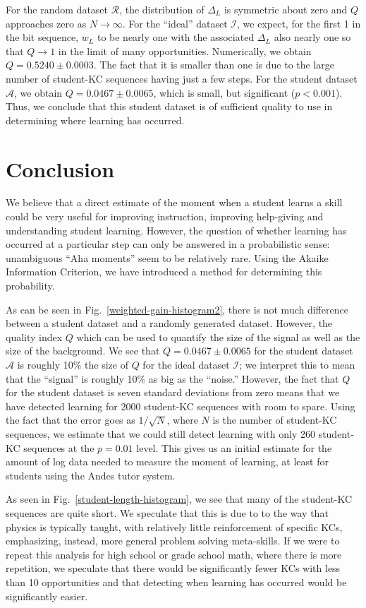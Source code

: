 \documentclass{acmlarge-edm}
\begin{document}
For the random dataset $\mathcal{R}$, the distribution of $\Delta_L$
is symmetric about zero and $Q$ approaches zero as $N \to \infty$.
For the ``ideal'' dataset $\mathcal{I}$, we expect, for the first 1 in
the bit sequence, $w_L$ to be nearly one with the associated $\Delta_L$
also nearly one so that $Q\to 1$ in the limit of many opportunities.
Numerically, we obtain $Q=0.5240\pm0.0003$.  The fact that it is
smaller than one is due to the large number of student-KC sequences having
just a few steps.  For the student dataset $\mathcal{A}$, we obtain
$Q=0.0467\pm0.0065$, which is small, but significant
($p<0.001$). Thus, we conclude that this student dataset is of
sufficient quality to use in determining where learning has occurred.


\section{Conclusion}

We believe that a direct estimate of the moment when a student
learns a skill could be very useful for improving instruction,
improving help-giving and understanding student learning.
However, the question of whether learning has occurred at a particular
step can only be answered in a probabilistic sense:
unambiguous ``Aha moments'' seem to be relatively rare.
Using the Akaike Information Criterion, we have introduced a method
for determining this probability.



As can be seen in
Fig.~\ref{weighted-gain-histogram2}, there is not much difference
between a student dataset and a randomly generated dataset.  However,
the quality index $Q$ which can be used to quantify the
size of the signal as well as the size of the background.  We see that
$Q=0.0467\pm0.0065$ for the student dataset $\mathcal{A}$ is roughly
10\% the size of $Q$ for the ideal dataset $\mathcal{I}$; we interpret
this to mean that the ``signal'' is roughly 10\% as big as the
``noise.''  However, the fact that $Q$ for the student dataset is
seven standard deviations from zero means that we have detected
learning for 2000 student-KC sequences with room to spare.  Using the fact
that the error goes as $1/\sqrt{N}$, where $N$ is the number 
of student-KC sequences, we estimate
that we could still detect learning with only 260 student-KC sequences at the
$p=0.01$ level.  This gives us an initial estimate for the amount of
log data needed to measure the moment of learning, at least for
students using the Andes tutor system.

As seen in Fig.~\ref{student-length-histogram}, we see that many of
the student-KC sequences are quite short.  We speculate that this
is due to to the way that physics is typically taught, with relatively
little reinforcement of specific KCs, emphasizing, instead, more
general problem solving meta-skills.  If we were to repeat this
analysis for high school or grade school math, where there is more
repetition, we speculate that there would be significantly fewer KCs
with less than 10 opportunities and that detecting when learning has
occurred would be significantly easier.




\end{document}
